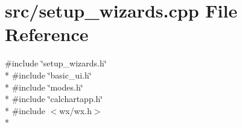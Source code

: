 \hypertarget{a00242}{\section{src/setup\-\_\-wizards.cpp File Reference}
\label{a00242}
}
{\ttfamily \#include \char`\"{}setup\-\_\-wizards.\-h\char`\"{}}\\*
{\ttfamily \#include \char`\"{}basic\-\_\-ui.\-h\char`\"{}}\\*
{\ttfamily \#include \char`\"{}modes.\-h\char`\"{}}\\*
{\ttfamily \#include \char`\"{}calchartapp.\-h\char`\"{}}\\*
{\ttfamily \#include $<$wx/wx.\-h$>$}\\*
